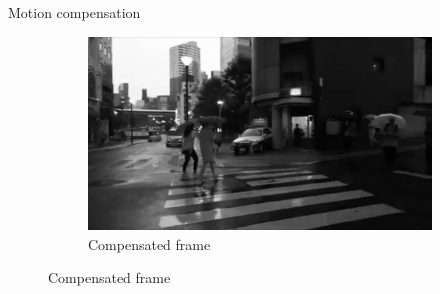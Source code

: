 \documentclass[aspectratio=1610,xcolor=dvipsnames]{beamer}
\begin{document}
\begin{frame}{Motion compensation}
\begin{figure}[htbp]
\begin{subfigure}[b]{0.3\textwidth}
            \includegraphics[width=\textwidth]{images/tokyo-compensated.png}
            \caption{Compensated frame}
            \label{fig:tokyo-compensated}
        \end{subfigure}
        

\end{figure}
\end{frame}
\end{document}
